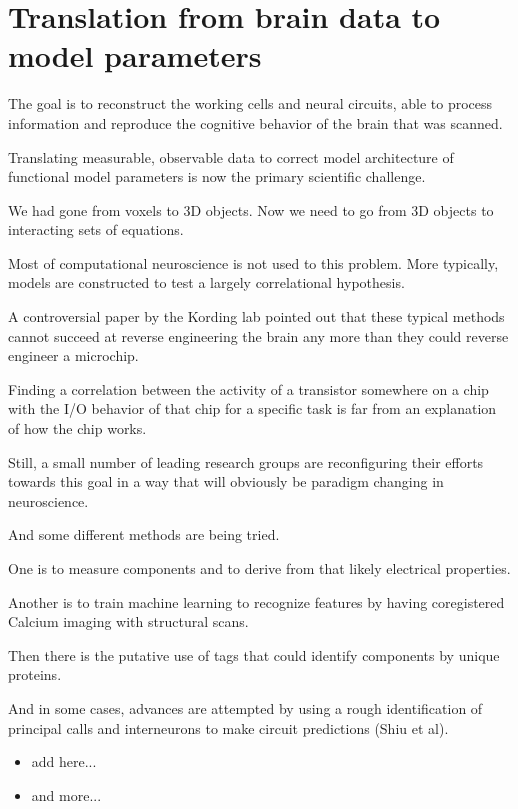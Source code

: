\documentclass{ldr-article}
\begin{document}
\section{Translation from brain data to model parameters}

The goal is to reconstruct the working cells and neural circuits, able to process information and reproduce the cognitive behavior of the brain that was scanned.

Translating measurable, observable data to correct model architecture of functional model parameters is now the primary scientific challenge.

We had gone from voxels to 3D objects. Now we need to go from 3D objects to interacting sets of equations.

Most of computational neuroscience is not used to this problem. More typically, models are constructed to test a largely correlational hypothesis.

A controversial paper by the Kording lab pointed out that these typical methods cannot succeed at reverse engineering the brain any more than they could reverse engineer a microchip.

Finding a correlation between the activity of a transistor somewhere on a chip with the I/O behavior of that chip for a specific task is far from an explanation of how the chip works.

Still, a small number of leading research groups are reconfiguring their efforts towards this goal in a way that will obviously be paradigm changing in neuroscience.

And some different methods are being tried.

One is to measure components and to derive from that likely electrical properties.

Another is to train machine learning to recognize features by having coregistered Calcium imaging with structural scans.

Then there is the putative use of tags that could identify components by unique proteins.

And in some cases, advances are attempted by using a rough identification of principal calls and interneurons to make circuit predictions (Shiu et al).

\begin{itemize}
	\item add here...
	\item and more...
\end{itemize}
\end{document}
